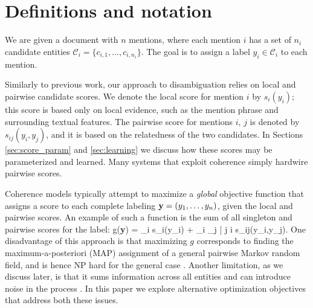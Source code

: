 \section{Definitions and notation}
\label{sec:notation}

We are given a document with $n$ mentions, where each mention $i$ has a set of $n_i$ candidate entities $\mathcal{C}_i = \{c_{i,1}, ..., c_{i,n_i}\}$. The goal is to assign a label $y_i \in \mathcal{C}_i$ to each mention.

Similarly to previous work, our approach to disambiguation relies on local and pairwise candidate scores. We denote the local score for mention $i$ by $s_i(y_i)$; this score is based only on local evidence, such as the mention phrase and surrounding textual features. The pairwise score for mentions $i$, $j$ is denoted by $s_{ij}(y_i, y_j)$,  and it is based on the relatedness of the two candidates. In Sections \ref{sec:score_param} and \ref{sec:learning} we discuss how these scores may be parameterized and learned.  Many systems that exploit coherence \cite{Cucerzan07,Milne2008,KulkarniSRC09} simply hardwire pairwise scores.


Coherence models typically attempt to maximize a {\em global} objective function that assigns a score to each complete labeling ${\bf y} = (y_1,\ldots, y_n)$, given the local and pairwise scores. An example of such a function is the sum of all singleton and pairwise scores for the label:
\be
g({\bf y}) = \sum_i s_i(y_i) + \sum_i \sum_{j | j \neq i} s_{ij}(y_i,y_j).
\label{eq:global_obj}
\ee 
One disadvantage of this approach is that maximizing $g$ corresponds to finding the maximum-a-posteriori (MAP) assignment of a general pairwise Markov random field, and is hence
NP hard for the general case \cite{wainwright2008graphical}. Another limitation, as we discuss later, is that it sums information across all entities and can introduce noise in the process . In this paper we explore alternative optimization objectives that address both these issues.



